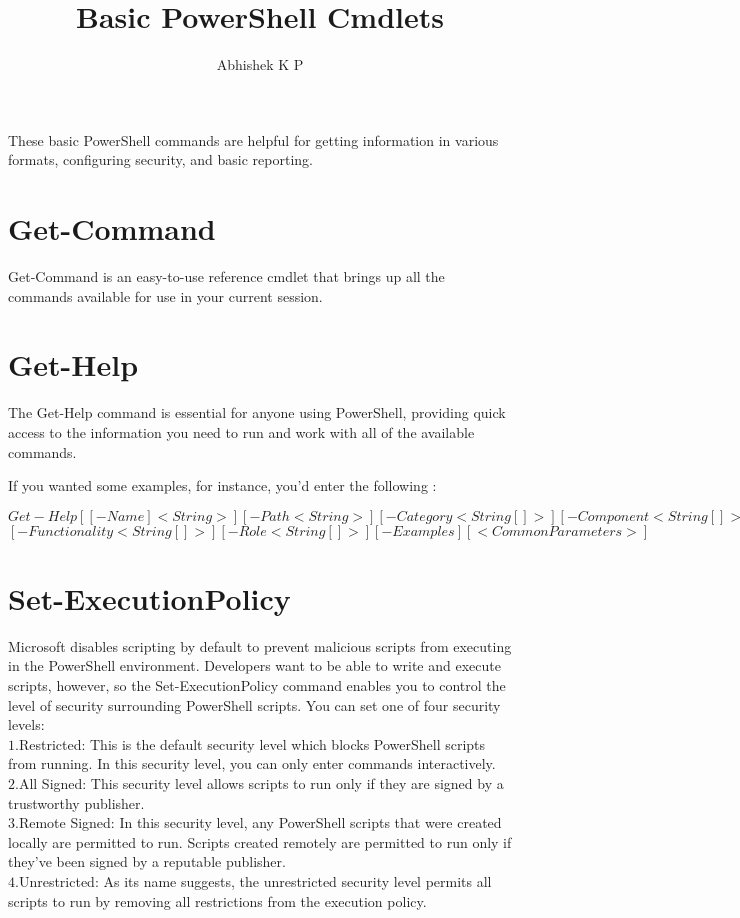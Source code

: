 \documentclass[12pt]{article}
\title{Basic PowerShell Cmdlets}
\author{Abhishek K P}
\date{}
\begin{document}
\maketitle
These basic PowerShell commands are helpful for getting information in various formats, configuring security, and basic reporting.

\section{Get-Command}
Get-Command is an easy-to-use reference cmdlet that brings up all the commands available for use in your current session.

\section{ Get-Help}
The Get-Help command is essential for anyone using PowerShell, providing quick access to the information you need to run and work with all of the available commands.

If you wanted some examples, for instance, you’d enter the following :

$Get-Help [[-Name] <String>] [-Path <String>] [-Category <String[]>] [-Component <String[]>]$ \\
$[-Functionality <String[]>] [-Role <String[]>] [-Examples] [<CommonParameters>]$

\section{Set-ExecutionPolicy}
Microsoft disables scripting by default to prevent malicious scripts from executing in the PowerShell environment. Developers want to be able to write and execute scripts, however, so the Set-ExecutionPolicy command enables you to control the level of security surrounding PowerShell scripts. You can set one of four security levels: \\

$1.$Restricted: This is the default security level which blocks PowerShell scripts from running. In this security level, you can only enter commands interactively.\\
$2.$All Signed: This security level allows scripts to run only if they are signed by a trustworthy publisher.\\
$3.$Remote Signed: In this security level, any PowerShell scripts that were created locally are permitted to run. Scripts created remotely are permitted to run only if they’ve been signed by a reputable publisher.\\
$4.$Unrestricted: As its name suggests, the unrestricted security level permits all scripts to run by removing all restrictions from the execution policy.
\end{document}
